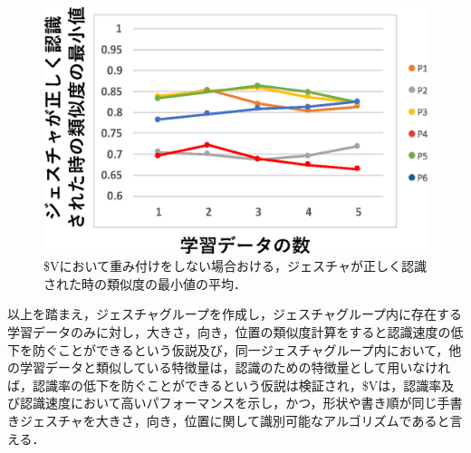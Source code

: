 \begin{figure}[!h]
\centering
\includegraphics[width=0.7\columnwidth]{img/rec_min_10.eps}
\caption{\$Vにおいて重み付けをしない場合おける，ジェスチャが正しく認識された時の類似度の最小値の平均．}
\label{fig:rec_min_10}
\end{figure}

\clearpage
以上を踏まえ，ジェスチャグループを作成し，ジェスチャグループ内に存在する学習データのみに対し，大きさ，向き，位置の類似度計算をすると認識速度の低下を防ぐことができるという仮説及び，同一ジェスチャグループ内において，他の学習データと類似している特徴量は，認識のための特徴量として用いなければ，認識率の低下を防ぐことができるという仮説は検証され，\$Vは，認識率及び認識速度において高いパフォーマンスを示し，かつ，形状や書き順が同じ手書きジェスチャを大きさ，向き，位置に関して識別可能なアルゴリズムであると言える．

